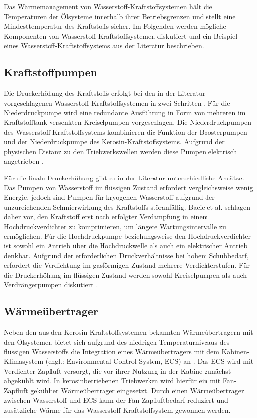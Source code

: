 Das Wärmemanagement von Wasserstoff-Kraftstoffsystemen hält die Temperaturen der Ölsysteme innerhalb ihrer Betriebsgrenzen und stellt eine Mindesttemperatur des Kraftstoffs sicher. Im Folgenden werden mögliche Komponenten von Wasserstoff-Kraftstoffsystemen diskutiert und ein Beispiel eines Wasserstoff-Kraftstoffsystems aus der Literatur beschrieben.

\subsection{Kraftstoffpumpen}

Die Druckerhöhung des Kraftstoffs erfolgt bei den in der Literatur vorgeschlagenen Wasserstoff-Kraftstoffsystemen in zwei Schritten \cite{Ebrahimi.2024}. Für die Niederdruckpumpe wird eine redundante Ausführung in Form von mehreren im Kraftstofftank versenkten Kreiselpumpen vorgeschlagen. Die Niederdruckpumpen des Wasserstoff-Kraftstoffsystems kombinieren die Funktion der Boosterpumpen und der Niederdruckpumpe des Kerosin-Kraftstoffsystems. Aufgrund der physischen Distanz zu den Triebwerkswellen werden diese Pumpen elektrisch angetrieben \cite{Scholz.2003}. 

Für die finale Druckerhöhung gibt es in der Literatur unterschiedliche Ansätze. Das Pumpen von Wasserstoff im flüssigen Zustand erfordert vergleichsweise wenig Energie, jedoch sind Pumpen für kryogenen Wasserstoff aufgrund der unzureichenden Schmierwirkung des Kraftstoffs störanfällig. Bacic et al. \cite{BacicMarkoCoullJohn.2024} schlagen daher vor, den Kraftstoff erst nach erfolgter Verdampfung in einem Hochdruckverdichter zu komprimieren, um längere Wartungsintervalle zu ermöglichen. Für die Hochdruckpumpe beziehungsweise den Hochdruckverdichter ist sowohl ein Antrieb über die Hochdruckwelle als auch ein elektrischer Antrieb denkbar. Aufgrund der erforderlichen Druckverhältnisse bei hohem Schubbedarf, erfordert die Verdichtung im gasförmigen Zustand mehrere Verdichterstufen. Für die Druckerhöhung im flüssigen Zustand werden sowohl Kreiselpumpen als auch Verdrängerpumpen diskutiert \cite{Scholz.2003, Shaffer.2014}.

\subsection{Wärmeübertrager}

Neben den aus den Kerosin-Kraftstoffsystemen bekannten Wärmeübertragern mit den Ölsystemen bietet sich aufgrund des niedrigen Temperaturniveaus des flüssigen Wasserstoffs die Integration eines Wärmeübertragers mit dem Kabinen-Klimasystem (engl.: Environmental Control System, ECS) an \cite{Brewer.1991}. Das ECS wird mit Verdichter-Zapfluft versorgt, die vor ihrer Nutzung in der Kabine zunächst abgekühlt wird. In kerosinbetriebenen Triebwerken wird hierfür ein mit Fan-Zapfluft gekühlter Wärmeübertrager eingesetzt. Durch einen Wärmeübertrager zwischen Wasserstoff und ECS kann der Fan-Zapfluftbedarf reduziert und zusätzliche Wärme für das Wasserstoff-Kraftstoffsystem gewonnen werden. 

